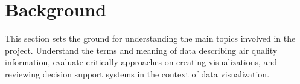 \chapter{Background}
This section sets the ground for understanding the main topics involved in the project. Understand the terms and meaning of data describing air quality information, evaluate critically approaches on creating visualizations, and reviewing decision support systems  in the context of data visualization.




